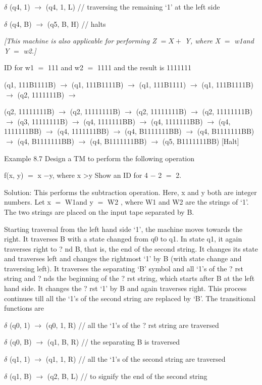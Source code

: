 \documentclass{article}
\begin{document}
$\delta $ (q4, 1) $\to $ (q4, 1, L) // traversing the remaining `1' at the
left side

$\delta $ (q4, B) $\to $ (q5, B, H) // halts

\textit{[This machine is also applicable for performing Z }$= X +$\textit{ Y, where X }$=$\textit{ \textbar w1\textbar and Y }$=$\textit{ \textbar w2\textbar .] }

ID for w1 $=$ 111 and w2 $=$ 1111 and the result is 1111111

(q1, 111B1111B) $\to $ (q1, 111B1111B) $\to $ (q1, 111B1111) $\to $ (q1,
111B1111B) $\to $ (q2, 1111111B) $\to $

(q2, 11111111B) $\to $ (q2, 11111111B) $\to $ (q2, 11111111B) $\to $ (q2,
11111111B) $\to $ (q3, 11111111B) $\to $ (q4, 1111111BB) $\to $ (q4,
1111111BB) $\to $ (q4, 1111111BB) $\to $ (q4, 1111111BB) $\to $ (q4,
B1111111BB) $\to $ (q4, B1111111BB) $\to $ (q4, B1111111BB) $\to $ (q4,
B1111111BB) $\to $ (q5, B1111111BB) [Halt]

Example 8.7 Design a TM to perform the following operation

f(x, y) $=$ x $-$y, where x \textgreater y Show an ID for 4 $-$ 2 $=$ 2.

Solution: This performs the subtraction operation. Here, x and y both are
integer numbers. Let x $=$ \textbar W1\textbar and y $=$ \textbar W2\textbar
, where W1 and W2 are the strings of `1'. The two strings are placed on the
input tape separated by B.

Starting traversal from the left hand side `1', the machine moves towards
the right. It traverses B with a state changed from q0 to q1. In state q1,
it again traverses right to ? nd B, that is, the end of the second string.
It changes its state and traverses left and changes the rightmost `1' by B
(with state change and traversing left). It traverses the separating `B'
symbol and all `1's of the ? rst string and ? nds the beginning of the ? rst
string, which starts after B at the left hand side. It changes the ? rst `1'
by B and again traverses right. This process continues till all the `1's of
the second string are replaced by `B'. The transitional functions are

$\delta $ (q0, 1) $\to $ (q0, 1, R) // all the `1's of the ? rst string are
traversed

$\delta $ (q0, B) $\to $ (q1, B, R) // the separating B is traversed

$\delta $ (q1, 1) $\to $ (q1, 1, R) // all the `1's of the second string are
traversed

$\delta $ (q1, B) $\to $ (q2, B, L) // to signify the end of the second string
\end{document}

